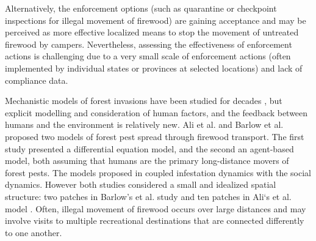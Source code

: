 Alternatively, the enforcement options (such as quarantine or checkpoint inspections for illegal movement of firewood) are gaining acceptance and may be perceived as more effective localized means to stop the movement of untreated firewood by campers. Nevertheless, assessing the effectiveness of enforcement actions is challenging due to a very small scale of enforcement actions (often implemented by individual states or provinces at selected locations) and lack of compliance data. 

Mechanistic models of forest invasions have been studied for decades \cite{ludwig1978qualitative}, but explicit modelling and consideration of human factors, and the feedback between humans and the environment is relatively new. Ali et al. and Barlow et al. \cite{barlow2014modelling,ali2015coupled} proposed two models of forest pest spread through firewood transport.  The first study presented a differential equation model, and the second an agent-based model, both assuming that humans are the primary long-distance movers of forest pests. The models proposed in \cite{barlow2014modelling,ali2015coupled} coupled infestation dynamics with the social dynamics. However both studies considered a small and idealized spatial structure: two patches in Barlow's et al. \cite{barlow2014modelling} study and ten patches in Ali‘s et al. model \cite{ali2015coupled}. Often, illegal movement of firewood occurs over large distances and may involve visits to multiple recreational destinations that are connected differently to one another. 



